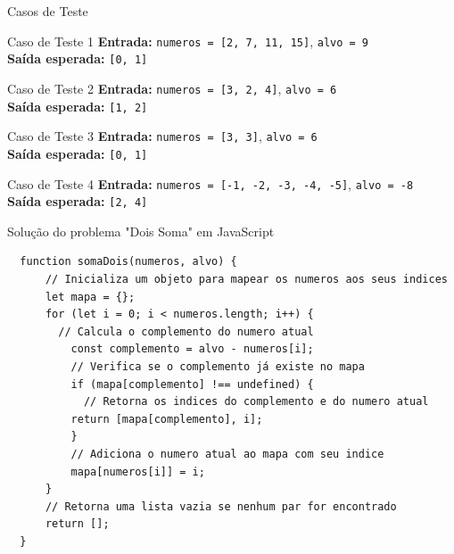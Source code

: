 \begin{frame}{Casos de Teste}
  \begin{block}{Caso de Teste 1}
      \textbf{Entrada:} \texttt{numeros = [2, 7, 11, 15]}, \texttt{alvo = 9}\\
      \textbf{Saída esperada:} \texttt{[0, 1]}
  \end{block}

  \begin{block}{Caso de Teste 2}
      \textbf{Entrada:} \texttt{numeros = [3, 2, 4]}, \texttt{alvo = 6}\\
      \textbf{Saída esperada:} \texttt{[1, 2]}
  \end{block}

  \begin{block}{Caso de Teste 3}
      \textbf{Entrada:} \texttt{numeros = [3, 3]}, \texttt{alvo = 6}\\
      \textbf{Saída esperada:} \texttt{[0, 1]}
  \end{block}

  \begin{block}{Caso de Teste 4}
      \textbf{Entrada:} \texttt{numeros = [-1, -2, -3, -4, -5]}, \texttt{alvo = -8}\\
      \textbf{Saída esperada:} \texttt{[2, 4]}
  \end{block}
\end{frame}
\begin{frame}[fragile]{Solução do problema "Dois Soma" em JavaScript}
  \small
  \begin{lstlisting}
  function somaDois(numeros, alvo) {
      // Inicializa um objeto para mapear os numeros aos seus indices
      let mapa = {}; 
      for (let i = 0; i < numeros.length; i++) {
        // Calcula o complemento do numero atual
          const complemento = alvo - numeros[i]; 
          // Verifica se o complemento já existe no mapa
          if (mapa[complemento] !== undefined) {
            // Retorna os indices do complemento e do numero atual    
          return [mapa[complemento], i]; 
          }
          // Adiciona o numero atual ao mapa com seu indice
          mapa[numeros[i]] = i; 
      }
      // Retorna uma lista vazia se nenhum par for encontrado
      return []; 
  }
  \end{lstlisting}
\end{frame}

